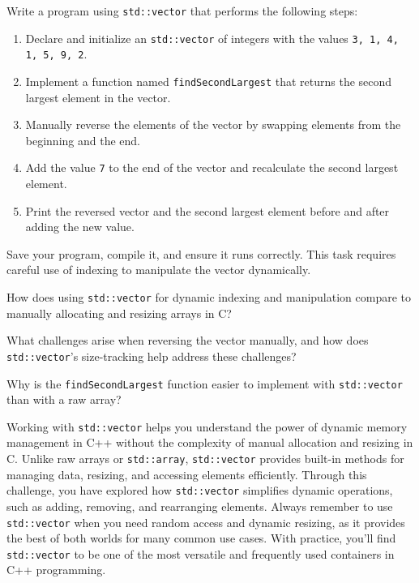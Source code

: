 \begin{challenge}
    \begin{task}
        Write a program using \texttt{std::vector} that performs the following steps:
        \begin{enumerate}
            \item Declare and initialize an \texttt{std::vector} of integers with the values \texttt{3, 1, 4, 1, 5, 9, 2}.
            \item Implement a function named \texttt{findSecondLargest} that returns the second largest element in the vector.
            \item Manually reverse the elements of the vector by swapping elements from the beginning and the end.
            \item Add the value \texttt{7} to the end of the vector and recalculate the second largest element.
            \item Print the reversed vector and the second largest element before and after adding the new value.
        \end{enumerate}

        Save your program, compile it, and ensure it runs correctly. This task requires careful use of indexing to manipulate the vector dynamically.

        \begin{questions}
            \item How does using \texttt{std::vector} for dynamic indexing and manipulation compare to manually allocating and resizing arrays in C?
            \item What challenges arise when reversing the vector manually, and how does \texttt{std::vector}'s size-tracking help address these challenges?
            \item Why is the \texttt{findSecondLargest} function easier to implement with \texttt{std::vector} than with a raw array?
        \end{questions}
    \end{task}

    \begin{advice}
        Working with \texttt{std::vector} helps you understand the power of dynamic memory management in C++ without the complexity of manual allocation and resizing in C. 
        Unlike raw arrays or \texttt{std::array}, \texttt{std::vector} provides built-in methods for managing data, resizing, and accessing elements efficiently. 
        Through this challenge, you have explored how \texttt{std::vector} simplifies dynamic operations, such as adding, removing, and rearranging elements. 
        Always remember to use \texttt{std::vector} when you need random access and dynamic resizing, as it provides the best of both worlds for many common use cases. 
        With practice, you'll find \texttt{std::vector} to be one of the most versatile and frequently used containers in C++ programming.
    \end{advice}
\end{challenge}
